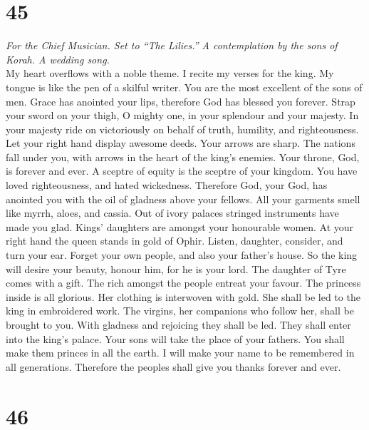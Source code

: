 \hypertarget{section-44}{%
\section{45}\label{section-44}}

\emph{For the Chief Musician. Set to ``The Lilies.'' A contemplation by
the sons of Korah. A wedding song.}\\
 My heart overflows with a noble theme. I recite my verses
for the king. My tongue is like the pen of a skilful writer.
 You are the most excellent of the sons of men. Grace has
anointed your lips, therefore God has blessed you forever.
 Strap your sword on your thigh, O mighty one, in your
splendour and your majesty.  In your majesty ride on
victoriously on behalf of truth, humility, and righteousness. Let your
right hand display awesome deeds.  Your arrows are sharp.
The nations fall under you, with arrows in the heart of the king's
enemies.  Your throne, God, is forever and ever. A sceptre
of equity is the sceptre of your kingdom.  You have loved
righteousness, and hated wickedness. Therefore God, your God, has
anointed you with the oil of gladness above your fellows. 
All your garments smell like myrrh, aloes, and cassia. Out of ivory
palaces stringed instruments have made you glad.  Kings'
daughters are amongst your honourable women. At your right hand the
queen stands in gold of Ophir.  Listen, daughter,
consider, and turn your ear. Forget your own people, and also your
father's house.  So the king will desire your beauty,
honour him, for he is your lord.  The daughter of Tyre
comes with a gift. The rich amongst the people entreat your favour.
 The princess inside is all glorious. Her clothing is
interwoven with gold.  She shall be led to the king in
embroidered work. The virgins, her companions who follow her, shall be
brought to you.  With gladness and rejoicing they shall
be led. They shall enter into the king's palace.  Your
sons will take the place of your fathers. You shall make them princes in
all the earth.  I will make your name to be remembered in
all generations. Therefore the peoples shall give you thanks forever and
ever.

\hypertarget{section-45}{%
\section{46}\label{section-45}}

